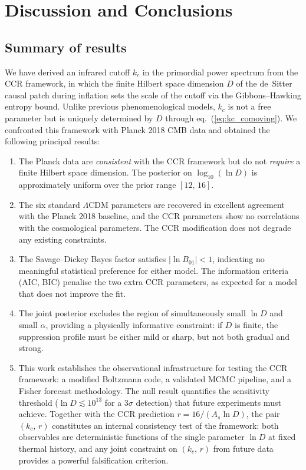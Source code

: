 
\section{Discussion and Conclusions}
\label{sec:conclusions}

\subsection{Summary of results}

We have derived an infrared cutoff $k_c$ in the primordial power
spectrum from the CCR framework, in which the finite Hilbert space
dimension $D$ of the de~Sitter causal patch during inflation sets the
scale of the cutoff via the Gibbons--Hawking entropy bound. Unlike
previous phenomenological models, $k_c$ is not a free parameter but is
uniquely determined by $D$ through eq.~(\ref{eq:kc_comoving}). We
confronted this framework with Planck 2018 CMB data and obtained the
following principal results:

\begin{enumerate}
  \item The Planck data are \emph{consistent} with the CCR framework
    but do not \emph{require} a finite Hilbert space dimension. The
    posterior on $\log_{10}(\ln D)$ is approximately uniform over the
    prior range $[12,\,16]$.
  \item The six standard $\Lambda$CDM parameters are recovered in
    excellent agreement with the Planck 2018 baseline, and the CCR
    parameters show no correlations with the cosmological parameters.
    The CCR modification does not degrade any existing constraints.
  \item The Savage--Dickey Bayes factor satisfies $|\ln B_{01}| < 1$,
    indicating no meaningful statistical preference for either model. The
    information criteria (AIC, BIC) penalise the two extra CCR
    parameters, as expected for a model that does not improve the fit.
  \item The joint posterior excludes the region of simultaneously small
    $\ln D$ and small $\alpha$, providing a physically informative
    constraint: if $D$ is finite, the suppression profile must be
    either mild or sharp, but not both gradual and strong.
  \item This work establishes the observational infrastructure for
    testing the CCR framework: a modified Boltzmann code, a validated
    MCMC pipeline, and a Fisher forecast methodology. The null result
    quantifies the sensitivity threshold ($\ln D \lesssim 10^{13}$
    for a $3\sigma$ detection) that future experiments must achieve.
    Together with the CCR prediction $r = 16/(A_s \ln D)$, the pair
    $(k_c,\, r)$ constitutes an internal consistency test of the
    framework: both observables are deterministic functions of the
    single parameter $\ln D$ at fixed thermal history, and any joint
    constraint on $(k_c,\, r)$ from future data provides a powerful
    falsification criterion.
\end{enumerate}

